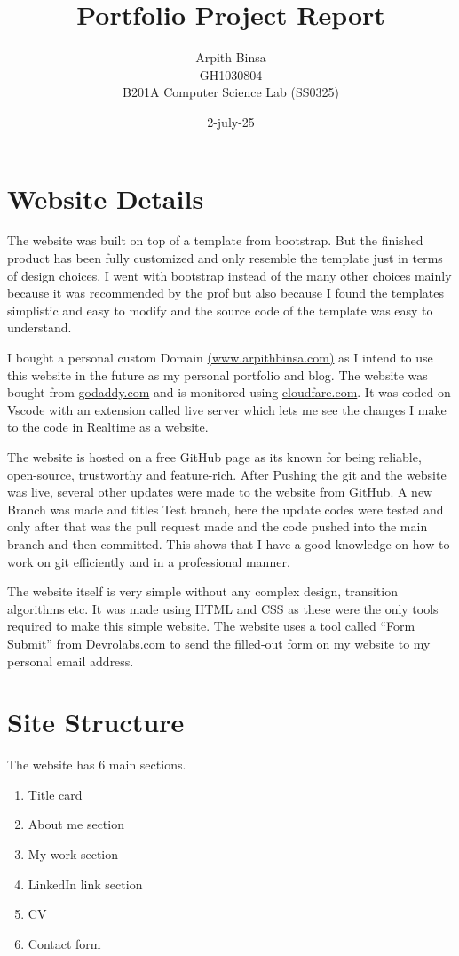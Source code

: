 \documentclass[12pt]{article}
\title{\textbf{Portfolio Project Report}}
\author{Arpith Binsa \\ GH1030804 \\ B201A Computer Science Lab (SS0325)}
\date{2-july-25}
\begin{document}
\maketitle

\section*{Website Details}
The website was built on top of a template from bootstrap. But the finished product has been fully customized and only resemble the template just in terms of design choices.
I went with bootstrap instead of the many other choices mainly because it was recommended by the prof but also because I found the templates simplistic and easy to modify and the source code of the template was easy to understand.

I bought a personal custom Domain \href{https://www.arpithbinsa.com} {(www.arpithbinsa.com)} as I intend to use this website in the future as my personal portfolio and blog. The website was bought from \href{www.goddady.com}{godaddy.com} and is monitored using \href{www.cloudfare.com}{cloudfare.com}. It was coded on Vscode with an extension called live server which lets me see the changes I make to the code in Realtime as a website.

The website is hosted on a free GitHub page as its known for being reliable, open-source, trustworthy and feature-rich. After 	Pushing the git and the website was live, several other updates were made to the website from GitHub. A new Branch was made and titles Test branch, here the update codes were tested and only after that was the pull request made and the code pushed into the main branch and then committed. This shows that I have a good knowledge on how to work on git efficiently and in a professional manner.

The website itself is very simple without any complex design, transition algorithms etc. It was made using HTML and CSS as these were the only tools required to make this simple website. The website uses a tool called “Form Submit” from Devrolabs.com to send the filled-out form on my website to my personal email address.

\section*{Site Structure}
The website has 6 main sections.

\begin{enumerate}[label=\arabic*.]
    \item Title card
    \item About me section
    \item My work section
    \item LinkedIn link section
    \item CV
    \item Contact form
\end{enumerate}
\end{document}
